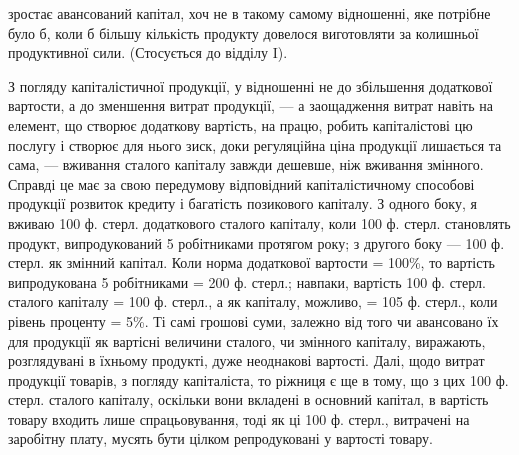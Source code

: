\parcont{}  %
зростає авансований капітал, хоч не в такому самому відношенні, яке потрібне
було б, коли б більшу кількість продукту довелося виготовляти за колишньої
продуктивної сили. (Стосується до відділу I).

З погляду капіталістичної продукції, у відношенні не до збільшення додаткової
вартости, а до зменшення витрат продукції, — а заощадження витрат
навіть на елемент, що створює додаткову вартість, на працю, робить капіталістові
цю послугу і створює для нього зиск, доки регуляційна ціна продукції
лишається та сама, — вживання сталого капіталу завжди дешевше, ніж
вживання змінного. Справді це має за свою передумову відповідний капіталістичному
способові продукції розвиток кредиту і багатість позикового капіталу. З одного
боку, я вживаю 100 ф. стерл. додаткового сталого капіталу, коли 100 ф.
стерл. становлять продукт, випродукований 5 робітниками протягом року; з
другого боку — 100 ф. стерл. як змінний капітал. Коли норма додаткової вартости
= 100\%, то вартість випродукована 5 робітниками = 200 ф. стерл.;
навпаки, вартість 100 ф. стерл. сталого капіталу = 100 ф. стерл., а як капіталу,
можливо, = 105 ф. стерл., коли рівень проценту = 5\%. Ті самі грошові суми,
залежно від того чи авансовано їх для продукції як вартісні величини сталого,
чи змінного капіталу, виражають, розглядувані в їхньому продукті, дуже неоднакові
вартості. Далі, щодо витрат продукції товарів, з погляду капіталіста,
то ріжниця є ще в тому, що з цих 100 ф. стерл. сталого капіталу, оскільки
вони вкладені в основний капітал, в вартість товару входить лише спрацьовування,
тоді як ці 100 ф. стерл., витрачені на заробітну плату, мусять бути
цілком репродуковані у вартості товару.

